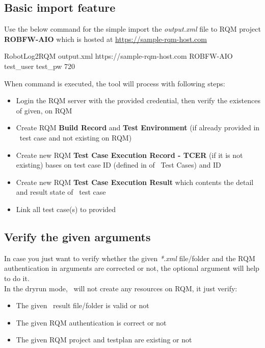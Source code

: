 \hypertarget{basic-features}{%
\subsection{Basic import feature}\label{basic-features}}

Use the below command for the simple import the \emph{output.xml} file to RQM
project \textbf{ROBFW-AIO} which is hosted at
\href{https://sample-rqm-host.com}{https://sample-rqm-host.com}
\begin{robotlog}
RobotLog2RQM output.xml https://sample-rqm-host.com ROBFW-AIO test_user test_pw 720
\end{robotlog}

When command is executed, the tool will process with following steps:
\begin{itemize}
\item Login the RQM server with the provided credential, then verify the
    existences of given, on RQM
\item Create RQM \textbf{Build Record} and \textbf{Test Environment} (if already
    provided in \rfwcore\ test case and not existing on RQM)
\item Create new RQM \textbf{Test Case Execution Record - TCER}
    (if it is not existing) bases on test case ID (defined  in
    \rcode{[Tags]} of \rfwcore\ Test Cases) and  ID
\item Create new RQM \textbf{Test Case Execution Result} which contents
    the detail and result state of \rfwcore\ test case
\item Link all test case(s) to provided 
\end{itemize}

\subsection{Verify the given arguments}
In case you just want to verify whether the given \emph{*.xml} file/folder and
the RQM authentication in arguments are corrected or not, the optional argument
 will help to do it.
\\
In the dryrun mode, \pkg\ will not create any resources on RQM, it
just verify:
\begin{itemize}
  \item The given \rfwcore\ result file/folder is valid or not
  \item The given RQM authentication is correct or not
  \item The given RQM project and testplan are existing or not
\end{itemize}

